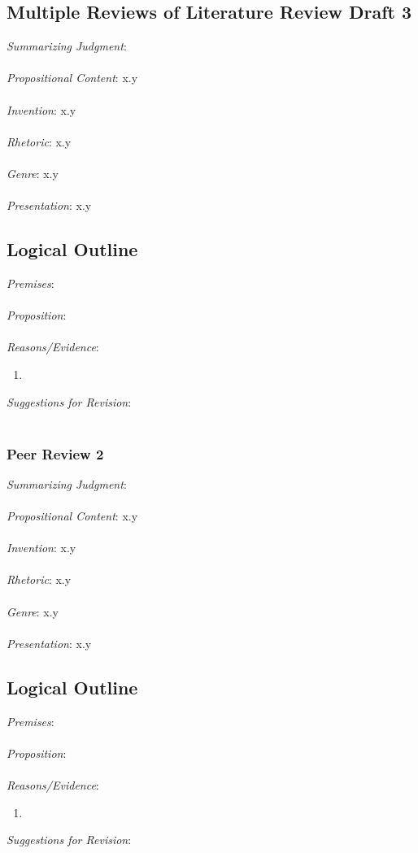 \documentclass[12pt]{article}
\begin{document}
\newpage
\subsection{Multiple Reviews of Literature Review Draft 3}
\noindent \textit{Summarizing Judgment}: \\ \\
\textit{Propositional Content}: x.y \\ \\ %
\textit{Invention}: x.y \\ \\
\textit{Rhetoric}: x.y \\ \\
\textit{Genre}: x.y \\ \\
\textit{Presentation}: x.y
\subsection*{Logical Outline}
\noindent \textit{Premises}: \\ \\
\textit{Proposition}: \\ \\
\textit{Reasons/Evidence}:
\begin{enumerate}
	\item \ %
\end{enumerate}
\textit{Suggestions for Revision}: \\\\

\subsubsection*{Peer Review 2}
\noindent \textit{Summarizing Judgment}: \\ \\
\textit{Propositional Content}: x.y \\ \\ %
\textit{Invention}: x.y \\ \\
\textit{Rhetoric}: x.y \\ \\
\textit{Genre}: x.y \\ \\
\textit{Presentation}: x.y
\subsection*{Logical Outline}
\noindent \textit{Premises}: \\ \\
\textit{Proposition}: \\ \\
\textit{Reasons/Evidence}:
\begin{enumerate}
	\item \ %
\end{enumerate}
\textit{Suggestions for Revision}: \\\\
\end{document}
